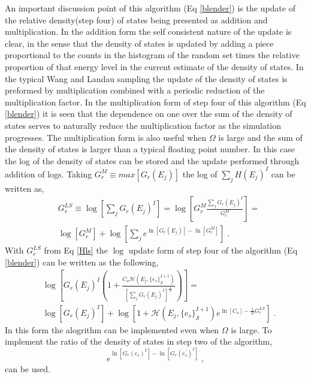 \documentclass[aps,prl,reprint,superscriptaddress,showkeys]{revtex4-1}
\begin{document}
An important discussion point of this algorithm (Eq \ref{blender}) is the update of the relative density(step four) of states being presented as addition and multiplication. In the addition form the self consistent nature of the update is clear, in the sense that the  density of states is updated by adding a  piece proportional to the counts in the histogram of the random set times the relative proportion of  that energy level in the current estimate of the density of states.  In the typical Wang and Landau sampling the update of the density of states is preformed by multiplication combined with a periodic reduction of the multiplication factor. In the multiplication form of step four of this algorithm (Eq \ref{blender}) it is seen that the dependence on one over the sum of the density of states serves to naturally reduce the multiplication factor as the simulation progresses. The multiplication form is also useful when $\Omega$ is large and the sum of the density of states is larger than a typical floating point number. In this case the log of the density of states can be stored and the update performed through addition of logs. Taking $G_{r}^M \equiv  max[G_{r}(E_j)]$ the log of $\sum_j H(E_j)^{I}$ can be written as, 
\begin{equation}
\begin{split}
&G_{r}^{LS} \equiv \log[\sum_j G_{r}(E_j)^{I}] = \log[G_{r}^M \frac{\sum_j G_{r}(E_j)^{I}}{G_{r}^M}]=\\
&\log[G_{r}^M] + \log[\sum_j e^{\ln[G_{r}(E_j)] - \ln[G_{r}^M]} ] \;.
\end{split}
\label{Hls}
\end{equation} 
With $G_r^{LS}$ from Eq \ref{Hls} the $\log$ update form of step four of the algorithm (Eq \ref{blender}) can be written as the following, 
\begin{equation}
\begin{split}
& \log[ G_{r}(E_j)^{I}( 1 +  \frac{C_o \mathcal{H}(E_j,\{e_s\}_{\mathcal{S}}^{I+1}) }{ [\sum_j G_{r}(E_j)^{I}]^{\frac{1}{N} } } ) ]=\\
& \log[ G_{r}(E_j)^{I} ] + \log[1 +   \mathcal{H}(E_j,\{e_s\}_{\mathcal{S}}^{I+1})e^{\ln[C_o]-\frac{1}{N}G_{r}^{LS}}] \;.
\end{split}
\end{equation}
In this form  the alogrithm can be implemented even when $\Omega$ is large. To implement the ratio of the density of states in step two of the algorithm, 
\begin{equation}
e^{\ln[G_{r}(e_s)^{I}] - \ln[G_{r}(e_s^{'})^{I}]} \;,
\end{equation}
can be used.
\end{document}
